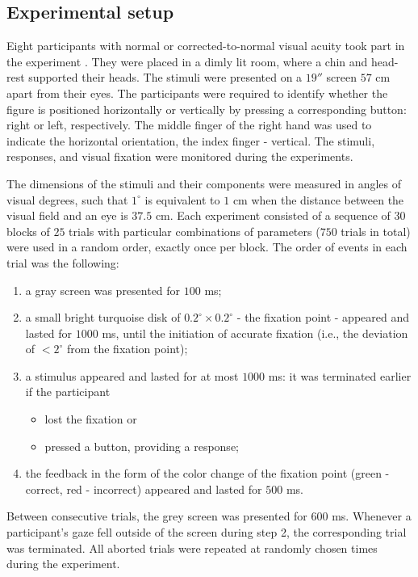\subsection{Experimental setup}

Eight participants with normal or corrected-to-normal visual acuity took part in the experiment \cite{MaryamPLACEHOLDER}. They were placed in a dimly lit room, where a chin and head-rest supported their heads. The stimuli were presented on a $19''$ screen $57$ cm  apart from their eyes. The participants were required to identify whether the figure is positioned horizontally or vertically by pressing a corresponding button: right or left, respectively. The middle finger of the right hand was used to indicate the horizontal orientation, the index finger - vertical.  The stimuli, responses, and visual fixation were monitored during the experiments.

The dimensions of the stimuli and their components were measured in angles of visual degrees, such that $1^\circ$ is equivalent to $1$ cm when the distance between the visual field and an eye is $37.5$ cm. Each experiment consisted of a sequence of $30$ blocks of $25$ trials with particular combinations of parameters ($750$ trials in total) were used in a random order, exactly once per block. The order of events in each trial was the following:
\begin{enumerate}
    \item a gray screen was presented for $100$ ms;
    
    \item a small bright turquoise disk of $0.2^\circ \times 0.2^\circ$ - the fixation point - appeared and lasted for $1000$ ms, until the initiation of accurate fixation (i.e., the deviation of $< 2^\circ$ from the fixation point); \\ 
    
    \item a stimulus appeared and lasted for at most $1000$ ms: it was terminated earlier if the participant
    \begin{itemize}
        \item lost the fixation or
        \item pressed a button, providing a response;
    \end{itemize}
    
    \item the feedback in the form of the color change of the fixation point (green - correct, red - incorrect) appeared and lasted for $500$ ms.
\end{enumerate}
Between consecutive trials, the grey screen was presented for $600$ ms.  Whenever a participant's gaze fell outside of the screen during step 2, the corresponding trial was terminated. All aborted trials were repeated at randomly chosen times during the experiment.
